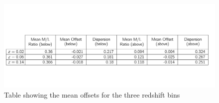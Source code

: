 \begin{figure}
\includegraphics[width=\textwidth]{figures/table.pdf}
\caption[Table showing the mean offsets for the three redshift bins.]
{Table showing the mean offsets for the three redshift bins
\label{tab: mean_offset_table}}
\end{figure}

